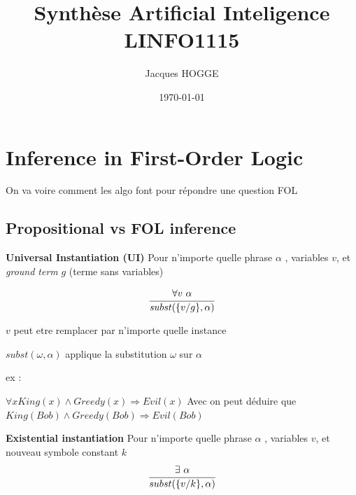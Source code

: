 \documentclass[12pt]{article}
\title{Synthèse Artificial Inteligence LINFO1115}
\author{Jacques HOGGE}
\date{\today}
\begin{document}
\maketitle
\newpage
\tableofcontents
\newpage



\newpage



\newpage



\newpage



\newpage



\newpage



\newpage



\newpage



			


\newpage
\section{Inference in First-Order Logic}
	On va voire comment les algo font pour répondre une question FOL
	\subsection{Propositional vs FOL inference}
		\textbf{Universal Instantiation (UI)} Pour n'importe quelle phrase $\alpha$ , variables $v$, et \textit{ground term} $g$ (terme sans variables)
		
		\begin{equation}
			\cfrac{\forall v \ \alpha}{subst(\{v/g\}, \alpha)}
		\end{equation}
		
		$v$ peut etre remplacer par n'importe quelle instance

		$subst(\omega,\alpha)$ applique la substitution $\omega$ sur $\alpha$
		
		ex : 
		
		$\forall x King(x) \land Greedy(x) \Rightarrow Evil(x)$ Avec on peut déduire que $King(Bob) \land Greedy(Bob) \Rightarrow Evil(Bob)$
		
		\textbf{Existential instantiation}
		Pour n'importe quelle phrase $\alpha$ , variables $v$, et nouveau symbole constant $k$
			\begin{equation}
				\cfrac{\exists \ \alpha}{subst(\{v/k\}, \alpha)}
			\end{equation}
		
\end{document}
